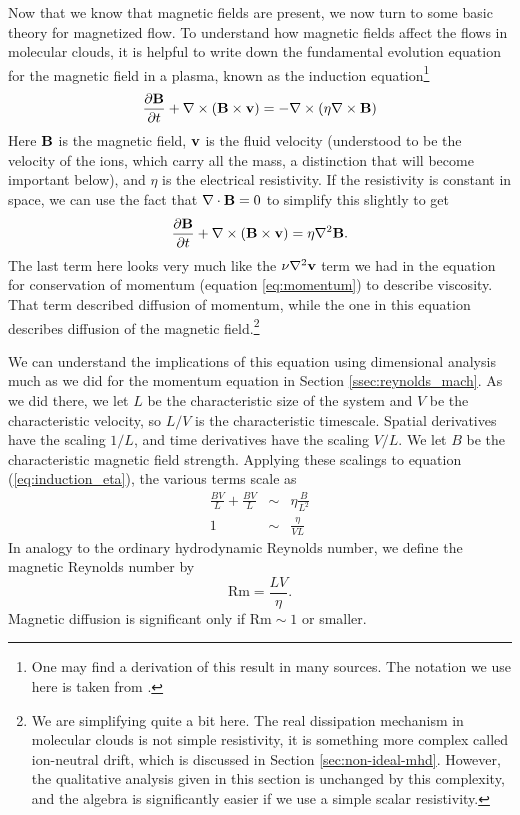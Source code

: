 Now that we know that magnetic fields are present, we now turn to some basic theory for magnetized flow. To understand how magnetic fields affect the flows in molecular clouds, it is helpful to write down the fundamental evolution equation for the magnetic field in a plasma, known as the induction equation\footnote{One may find a derivation of this result in many sources. The notation we use here is taken from \citet{shu92a}.}
\begin{equation}
\label{eq:induction}
\frac{\partial \vecB}{\partial t} + \nabla \times (\vecB \times \vecv) = -\nabla \times (\eta \nabla \times \vecB)
\end{equation}
Here $\mathbf{B}$ is the magnetic field, $\mathbf{v}$ is the fluid velocity (understood to be the velocity of the ions, which carry all the mass, a distinction that will become important below), and $\eta$ is the electrical resistivity. If the resistivity is constant in space, we can use the fact that $\nabla \cdot \mathbf{B}=0$ to simplify this slightly to get
\begin{equation}
\label{eq:induction_eta}
\frac{\partial \vecB}{\partial t} + \nabla \times (\vecB \times \vecv) = \eta \nabla^2 \vecB.
\end{equation}
The last term here looks very much like the $\nu\nabla^2 \mathbf{v}$ term we had in the equation for conservation of momentum (equation \ref{eq:momentum}) to describe viscosity. That term described diffusion of momentum, while the one in this equation describes diffusion of the magnetic field.\footnote{We are simplifying quite a bit here. The real dissipation mechanism in molecular clouds is not simple resistivity, it is something more complex called ion-neutral drift, which is discussed in Section \ref{sec:non-ideal-mhd}. However, the qualitative analysis given in this section is unchanged by this complexity, and the algebra is significantly easier if we use a simple scalar resistivity.}

We can understand the implications of this equation using dimensional analysis much as we did for the momentum equation in Section \ref{ssec:reynolds_mach}. As we did there, we let $L$ be the characteristic size of the system and $V$ be the characteristic velocity, so $L/V$ is the characteristic timescale. Spatial derivatives have the scaling $1/L$, and time derivatives have the scaling $V/L$. We let $B$ be the characteristic magnetic field strength. Applying these scalings to equation (\ref{eq:induction_eta}), the various terms scale as
\begin{eqnarray}
\frac{BV}{L} + \frac{BV}{L} & \sim & \eta \frac{B}{L^2} \\
1 & \sim & \frac{\eta}{VL}
\end{eqnarray}
In analogy to the ordinary hydrodynamic Reynolds number, we define the magnetic Reynolds number by
\begin{equation}
\mbox{Rm} = \frac{LV}{\eta}.
\end{equation}
Magnetic diffusion is significant only if $\mathrm{Rm} \sim 1$ or smaller.


